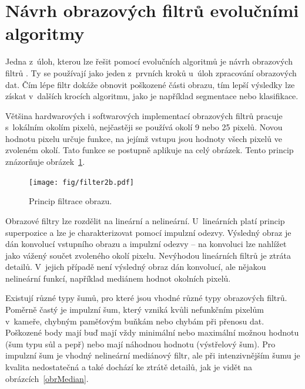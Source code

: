 \section{Návrh obrazových filtrů evolučními algoritmy}
\label{secIF}

Jedna z~úloh, kterou lze řešit pomocí evolučních algoritmů je návrh obrazových filtrů \cite{ZelenaIF}. Ty se používají jako jeden z~prvních kroků u~úloh zpracování obrazových dat. Čím lépe filtr dokáže obnovit poškozené části obrazu, tím lepší výsledky lze získat v~dalších krocích algoritmu, jako je například segmentace nebo klasifikace.

Většina hardwarových i softwarových implementací obrazových filtrů pracuje s~lokálním okolím pixelů, nejčastěji se používá okolí 9 nebo 25 pixelů. Novou hodnotu pixelu určuje funkce, na jejímž vstupu jsou hodnoty všech pixelů ve zvoleném okolí. Tato funkce se postupně aplikuje na celý obrázek. Tento princip znázorňuje obrázek~\ref{obrIFokoli}.

\begin{figure}[htb]
    \centering\texttt{[image: fig/filter2b.pdf]}
    \caption{Princip filtrace obrazu.}
    \label{obrIFokoli}
\end{figure}

Obrazové filtry lze rozdělit na lineární a nelineární. U~lineárních platí princip superpozice a lze je charakterizovat pomocí impulzní odezvy. Výsledný obraz je dán konvolucí vstupního obrazu a impulzní odezvy -- na konvoluci lze nahlížet jako vážený součet zvoleného okolí pixelu. Nevýhodou lineárních filtrů je ztráta detailů. V~jejich případě není výsledný obraz dán konvolucí, ale nějakou nelineární funkcí, například mediánem hodnot okolních pixelů.

Existují různé typy šumů, pro které jsou vhodné různé typy obrazových filtrů. Poměrně častý je impulzní šum, který vzniká kvůli nefunkčním pixelům v~kameře, chybným paměťovým buňkám nebo chybám při přenosu dat. Poškozené body mají buď mají vždy minimální nebo maximální možnou hodnotu (šum typu sůl a pepř) nebo mají náhodnou hodnotu (výstřelový šum). Pro impulzní šum je vhodný nelineární mediánový filtr, ale při intenzivnějším šumu je kvalita nedostatečná a také dochází ke ztrátě detailů, jak je vidět na obrázcích~\ref{obrMedian}.


